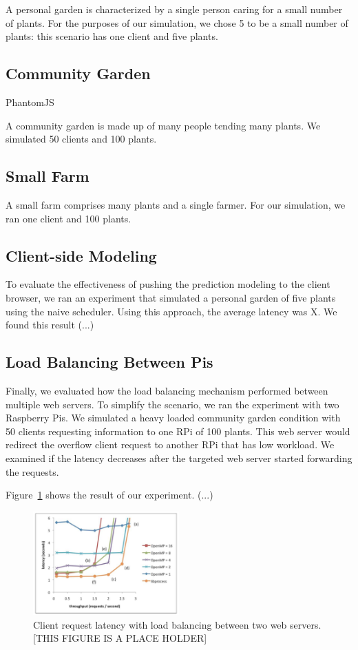 \documentclass[a4paper]{acm_proc_article-sp}
\begin{document}
A personal garden is characterized by a single person caring for a small number of plants.  For the purposes of our simulation, we chose 5 to be a small number of plants: this scenario has one client and five plants.

\subsection{Community Garden}

PhantomJS

A community garden is made up of many people tending many plants.  We simulated 50 clients and 100 plants.

\subsection{Small Farm}

A small farm comprises many plants and a single farmer.  For our simulation, we ran one client and 100 plants.

\subsection{Client-side Modeling}

To evaluate the effectiveness of pushing the prediction modeling to the client browser, we ran an experiment that simulated a personal garden of five plants using the naive scheduler.  Using this approach, the average latency was X. We found this result (...)

\subsection{Load Balancing Between Pis}

Finally, we evaluated how the load balancing mechanism performed between multiple web servers. To simplify the scenario, we ran the experiment with two Raspberry Pis. We simulated a heavy loaded community garden condition with 50 clients requesting information to one RPi of 100 plants. This web server would redirect the overflow client request to another RPi that has low workload. We examined if the latency decreases after the targeted web server started forwarding the requests.

Figure~\ref{fig:parallel_result} shows the result of our experiment. (...)

\begin{figure}
  \centering
      \includegraphics[width=0.5\textwidth]{multiplePis.png}
  \caption{\label{fig:parallel_result}Client request latency with load balancing between two web servers. [THIS FIGURE IS A PLACE HOLDER]}
\end{figure}
\end{document}
